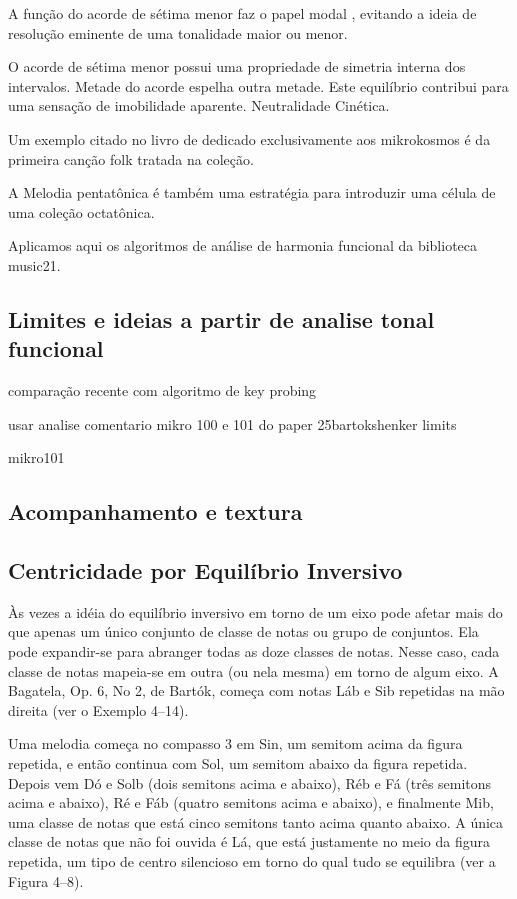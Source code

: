 \documentclass[
	12pt,				%
	openright,			%
	twoside,			%
	a4paper,			%
	english,			%
	french,				%
	spanish,			%
	brazil				%
	]{abntex2}
\begin{document}
A função do acorde de sétima menor faz o papel modal , evitando a ideia de resolução eminente de uma tonalidade maior ou menor.

O acorde de sétima menor possui uma propriedade de simetria interna dos intervalos. Metade do acorde espelha outra metade. Este equilíbrio contribui para uma sensação de imobilidade aparente. Neutralidade Cinética.



Um exemplo citado no livro de   dedicado exclusivamente aos mikrokosmos é da primeira canção folk tratada na coleção.

A Melodia pentatônica é também uma estratégia para introduzir uma célula de uma coleção octatônica.

Aplicamos aqui os algoritmos de análise de harmonia funcional da biblioteca music21.

\subsection{Limites e ideias a partir de analise tonal funcional}

comparação recente com algoritmo de key probing
\cite{cooper1998unfolding}


usar analise comentario mikro 100 e 101 do paper 25bartokshenker limits
\cite[ p.179]{brown1997iv}

mikro101
\cite[ p.113]{straus2004}

\subsection{Acompanhamento e textura}

\cite{starr1985melody}


\subsection{Centricidade por Equilíbrio Inversivo}
Às vezes a idéia do equilíbrio inversivo em torno de um eixo pode afetar mais do que
apenas um único conjunto de classe de notas ou grupo de conjuntos. Ela pode expandir-se
para abranger todas as doze classes de notas. Nesse caso, cada classe de notas mapeia-se
em outra (ou nela mesma) em torno de algum eixo. A Bagatela, Op. 6, No 2, de Bartók,
começa com notas Láb e Sib repetidas na mão direita (ver o Exemplo 4–14).

Uma melodia começa no compasso 3 em Sin, um semitom acima da figura repetida, e
então continua com Sol, um semitom abaixo da figura repetida. Depois vem Dó e Solb
(dois semitons acima e abaixo), Réb e Fá (três semitons acima e abaixo), Ré e Fáb (quatro
semitons acima e abaixo), e finalmente Mib, uma classe de notas que está cinco semitons
tanto acima quanto abaixo. A única classe de notas que não foi ouvida é Lá, que está
justamente no meio da figura repetida, um tipo de centro silencioso em torno do qual tudo
se equilibra (ver a Figura 4–8).
\cite[ p.121]{straus2004}
\end{document}
